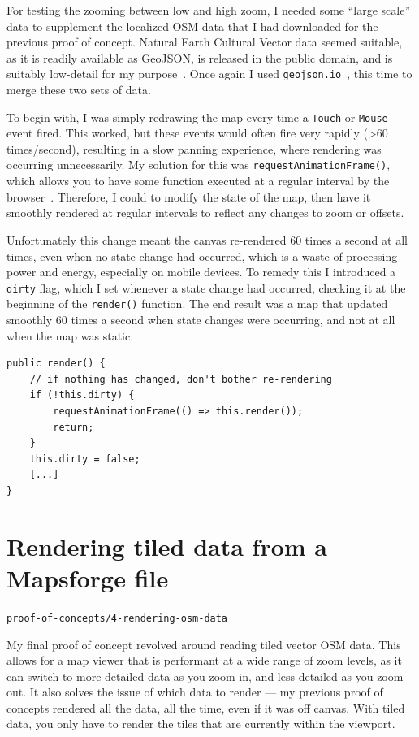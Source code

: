 \documentclass[]{final_report}
\begin{document}
For testing the zooming between low and high zoom, I needed some ``large scale'' data to supplement the localized OSM data that I had downloaded for the previous proof of concept. Natural Earth Cultural Vector data seemed suitable, as it is readily available as GeoJSON, is released in the public domain, and is suitably low-detail for my purpose~\cite{natural-earth}. Once again I used \texttt{geojson.io}~\cite{geojson.io}, this time to merge these two sets of data.

To begin with, I was simply redrawing the map every time a \texttt{Touch} or \texttt{Mouse} event fired. This worked, but these events would often fire very rapidly (>60 times/second), resulting in a slow panning experience, where rendering was occurring unnecessarily. My solution for this was \texttt{requestAnimationFrame()}, which allows you to have some function executed at a regular interval by the browser~\cite{mdn-request-animation-frame}. Therefore, I could to modify the state of the map, then have it smoothly rendered at regular intervals to reflect any changes to zoom or offsets.

Unfortunately this change meant the canvas re-rendered 60 times a second at all times, even when no state change had occurred, which is a waste of processing power and energy, especially on mobile devices. To remedy this I introduced a \texttt{dirty} flag, which I set whenever a state change had occurred, checking it at the beginning of the \texttt{render()} function. The end result was a map that updated smoothly 60 times a second when state changes were occurring, and not at all when the map was static.

\begin{lstlisting}[caption=Only rendering when the map state is \texttt{dirty}]
public render() {
    // if nothing has changed, don't bother re-rendering
    if (!this.dirty) {
        requestAnimationFrame(() => this.render());
        return;
    }
    this.dirty = false;
    [...]
}
\end{lstlisting}

\section{Rendering tiled data from a Mapsforge file}

\hfill \texttt{proof-of-concepts/4-rendering-osm-data}

My final proof of concept revolved around reading tiled vector OSM data. This allows for a map viewer that is performant at a wide range of zoom levels, as it can switch to more detailed data as you zoom in, and less detailed as you zoom out. It also solves the issue of which data to render --- my previous proof of concepts rendered all the data, all the time, even if it was off canvas. With tiled data, you only have to render the tiles that are currently within the viewport.
\end{document}
